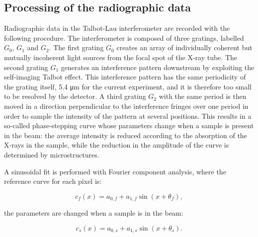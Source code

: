 \subsection{Processing of the radiographic data}\label{sec:radioprocessing}
Radiographic data in the Talbot-Lau interferometer are recorded with the
following procedure. The interferometer is composed of three gratings,
labelled $G_0$, $G_1$ and $G_2$. The first grating $G_0$ creates an array of
individually coherent but mutually incoherent light sources from the
focal spot of the X-ray tube. The second grating $G_1$ generates an
interference pattern downstream by exploiting the self-imaging Talbot
effect. This interference pattern has the same periodicity of the grating
itself, 5.4 μm for the current experiment, and it is therefore too small to
be resolved by the detector. A third grating $G_2$ with the same period is
then moved in a direction perpendicular to the interference fringes over one
period in order to sample the intensity of the pattern at several positions.
This results in a so-called phase-stepping curve whose parameters change
when a sample is present in the beam: the average intensity is reduced
according to the absorption of the X-rays in the sample, while the reduction
in the amplitude of the curve is determined by microstructures.

A sinusoidal fit is performed with Fourier component analysis, where the
reference curve for each pixel is:

\begin{equation}
    c_f(x) = a_{0,f} + a_{1,f} \sin(x + \theta_{f}),
    \label{eqn:flat}
\end{equation}

the parameters are changed when a sample is in the beam:

\begin{equation}
    c_s(x) = a_{0,s} + a_{1,s} \sin(x + \theta_{s}).
    \label{eqn:sample}
\end{equation}